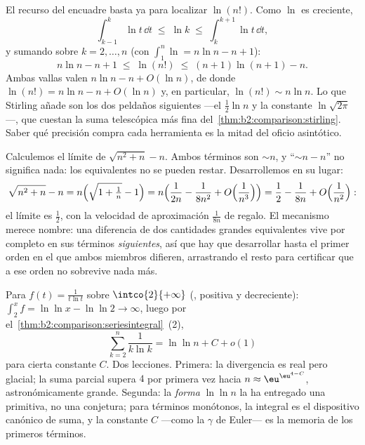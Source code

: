 \begin{example}\label{ex:b2:comparison:lnfactorial}
El recurso del encuadre basta ya para localizar $\ln(n!)$. Como
$\ln$ es creciente,
\[
\int_{k-1}^{k}\ln t\,\dd t \;\leq\; \ln k \;\leq\;
\int_{k}^{k+1}\ln t\,\dd t ,
\]
y sumando sobre $k = 2, \dots, n$ (con $\int_1^n\ln = n\ln n - n +
1$):
\[
n\ln n - n + 1 \;\leq\; \ln(n!) \;\leq\; (n+1)\ln(n+1) - n .
\]
Ambas vallas valen $n\ln n - n + O(\ln n)$, de donde $\ln(n!) =
n\ln n - n + O(\ln n)$ y, en particular, $\ln(n!) \sim n\ln n$. Lo
que Stirling añade son los dos peldaños siguientes ---el
$\frac12\ln n$ y la constante $\ln\sqrt{2\pi}$---, que cuestan la
suma telescópica más fina del~\cref{thm:b2:comparison:stirling}. Saber qué precisión compra cada
herramienta es la mitad del oficio asintótico.
\end{example}

\begin{example}\label{ex:b2:comparison:cancellation}
Calculemos el límite de $\sqrt{n^2 + n} - n$. Ambos términos son
$\sim n$, y ``$\sim n - n$'' no significa nada: los equivalentes no
se pueden restar. Desarrollemos en su lugar:
\[
\sqrt{n^2 + n} - n
= n\Bigl(\sqrt{1 + \tfrac1n} - 1\Bigr)
= n\Bigl(\frac{1}{2n} - \frac{1}{8n^2} +
O\Bigl(\frac1{n^3}\Bigr)\Bigr)
= \frac12 - \frac{1}{8n} + O\Bigl(\frac{1}{n^2}\Bigr) :
\]
el límite es $\frac12$, con la velocidad de aproximación
$\frac1{8n}$ de regalo. El mecanismo merece nombre: una diferencia
de dos cantidades grandes equivalentes vive por completo en sus
términos \emph{siguientes}, así que hay que desarrollar hasta el
primer orden en el que ambos miembros difieren, arrastrando el
resto para certificar que a ese orden no sobrevive nada más.
\end{example}

\begin{example}\label{ex:b2:comparison:loglog}
Para $f(t) = \frac{1}{t\ln t}$ sobre $\intco{2}{+\infty}$
(, positiva y decreciente): $\int_2^x f = \ln\ln x -
\ln\ln 2 \to \infty$, luego por el~\cref{thm:b2:comparison:seriesintegral}~(2),
\[
\sum_{k=2}^{n}\frac{1}{k\ln k} = \ln\ln n + C + o(1)
\]
para cierta constante $C$. Dos lecciones. Primera: la divergencia
es real pero glacial; la suma parcial supera $4$ por primera vez
hacia $n \approx \eu^{\eu^{4 - C}}$, astronómicamente grande.
Segunda: la \emph{forma} $\ln\ln n$ la ha entregado una primitiva,
no una conjetura; para términos monótonos, la integral es el
dispositivo canónico de suma, y la constante $C$ ---como la
$\gamma$ de Euler--- es la memoria de los primeros términos.
\end{example}

